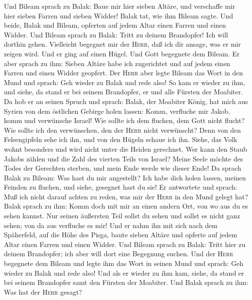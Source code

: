  Und Bileam sprach zu Balak: Baue mir hier sieben Altäre,
und verschaffe mir hier sieben Farren und sieben Widder! 
Balak tat, wie ihm Bileam sagte. Und beide, Balak und Bileam, opferten
auf jedem Altar einen Farren und einen Widder.  Und Bileam
sprach zu Balak: Tritt zu deinem Brandopfer! Ich will dorthin gehen.
Vielleicht begegnet mir der \textsc{Herr}, daß ich dir ansage, was er
mir zeigen wird.  Und er ging auf einen Hügel. Und Gott
begegnete dem Bileam. Er aber sprach zu ihm: Sieben Altäre habe ich
zugerichtet und auf jedem einen Farren und einen Widder geopfert.
 Der \textsc{Herr} aber legte Bileam das Wort in den Mund
und sprach: Geh wieder zu Balak und rede also!  So kam er
wieder zu ihm, und siehe, da stand er bei seinem Brandopfer, er und alle
Fürsten der Moabiter.  Da hob er an seinen Spruch und
sprach: Balak, der Moabiter König, hat mich aus Syrien von dem östlichen
Gebirge holen lassen: Komm, verfluche mir Jakob, komm und verwünsche
Israel!  Wie sollte ich dem fluchen, dem Gott nicht
flucht? Wie sollte ich den verwünschen, den der \textsc{Herr} nicht
verwünscht?  Denn von den Felsengipfeln sehe ich ihn, und
von den Hügeln schaue ich ihn. Siehe, das Volk wohnt besonders und wird
nicht unter die Heiden gerechnet.  Wer kann den Staub
Jakobs zählen und die Zahl des vierten Teils von Israel? Meine Seele
möchte des Todes der Gerechten sterben, und mein Ende werde wie dieser
Ende!  Da sprach Balak zu Bileam: Was hast du mir
angestellt? Ich habe dich holen lassen, meinen Feinden zu fluchen, und
siehe, gesegnet hast du sie!  Er antwortete und sprach:
Muß ich nicht darauf achten zu reden, was mir der \textsc{Herr} in den
Mund gelegt hat?  Balak sprach zu ihm: Komm doch mit mir
an einen andern Ort, von wo aus du es sehen kannst. Nur seinen äußersten
Teil sollst du sehen und sollst es nicht ganz sehen; von da aus
verfluche es mir!  Und er nahm ihn mit sich nach dem
Späherfeld, auf die Höhe des Pisga, baute sieben Altäre und opferte auf
jedem Altar einen Farren und einen Widder.  Und Bileam
sprach zu Balak: Tritt hier zu deinem Brandopfer; ich aber will dort
eine Begegnung suchen.  Und der \textsc{Herr} begegnete
dem Bileam und legte ihm das Wort in seinen Mund und sprach: Geh wieder
zu Balak und rede also!  Und als er wieder zu ihm kam,
siehe, da stand er bei seinem Brandopfer samt den Fürsten der Moabiter.
Und Balak sprach zu ihm: Was hat der \textsc{Herr} gesagt?
